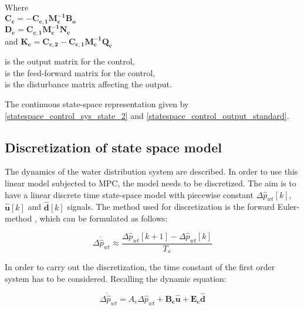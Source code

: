 \begin{minipage}[t]{0.40\textwidth}
Where\\
\hspace*{8mm} $\bm{C_c} = -\bm{C_{c,1}}\bm{M_c^{-1}}\bm{B_o} $ \\
\hspace*{8mm} $\bm{D_c} =  \bm{C_{c,1}}\bm{M_c^{-1}}\bm{N_c} $ \\
and \hspace*{0.7mm} $\bm{K_c} = \bm{C_{c,2}} -\bm{C_{c,1}}\bm{M_c^{-1}}\bm{Q_c} $
\end{minipage}
\begin{minipage}[t]{0.58\textwidth}
\vspace*{2mm}
is the output matrix for the control, \\
is the feed-forward matrix for the control, \\
is the disturbance matrix affecting the output.
\end{minipage} 

The continuous state-space representation given by \eqref{statespace_control_sys_state_2} and \eqref{statespace_control_output_standard}.

\subsection{Discretization of state space model}
 \label{discrete_SS}
 
The dynamics of the water distribution system are described. In order to use this linear model subjected to MPC, the model needs to be discretized. The aim is to have a linear discrete time state-space model with piecewise constant $\Delta \hat{p}_{wt}[k]$, $\bm{\hat{u}}[k]$ and $\bm{\hat{d}}[k]$ signals. The method used for discretization is the forward Euler-method \citep{franklin1994feedback}, which can be formulated as follows:

\begin{equation}
\Delta \dot{\hat{p}}_{wt} \approx  \frac{\Delta \hat{p}_{wt}[k+1] - \Delta\hat{p}_{wt}[k]}{T_s} 
 \label{statespace_discrete_state1}
\end{equation}

In order to carry out the discretization, the time constant of the first order system has to be considered. Recalling the dynamic equation:

\begin{equation}
\Delta \dot{\hat{p}}_{wt} = A_c \Delta \hat{p}_{wt}  + \bm{B_c} \bm{\hat{u}} + \bm{E_c} \bm{\hat{d}} 
\label{eq:cons_model_}
\end{equation}

